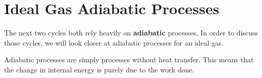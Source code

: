 


\section{Ideal Gas Adiabatic Processes} \label{sec:ch3_idealGasAdiabatic}
The next two cycles both rely heavily on {\bf adiabatic} processes.  In order to discuss those cycles, we will look closer at adiabatic processes for an ideal gas.

Adiabatic processes are simply processes without heat transfer.  This means that the change in internal energy is purely due to the work done.

